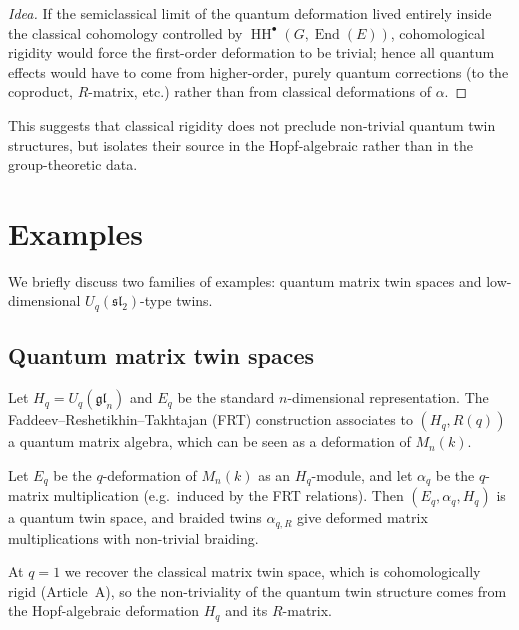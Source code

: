 \documentclass[11pt,a4paper]{article}
\numberwithin{equation}{section}
\DeclareMathOperator{\End}{End}
\DeclareMathOperator{\HH}{HH}
\begin{document}
	\begin{proof}[Idea]
		If the semiclassical limit of the quantum deformation lived entirely inside the classical cohomology 
		controlled by $\HH^\bullet(G,\End(E))$, cohomological rigidity would force the first-order deformation 
		to be trivial; hence all quantum effects would have to come from higher-order, purely quantum corrections 
		(to the coproduct, $R$-matrix, etc.) rather than from classical deformations of $\alpha$.
	\end{proof}
	
	This suggests that classical rigidity does not preclude non-trivial quantum twin structures, but isolates 
	their source in the Hopf-algebraic rather than in the group-theoretic data.
	
	\section{Examples}
	\label{sec:examples}
	
	We briefly discuss two families of examples: quantum matrix twin spaces and low-dimensional $U_q(\mathfrak{sl}_2)$-type twins.
	
	\subsection{Quantum matrix twin spaces}
	
	Let $H_q=U_q(\mathfrak{gl}_n)$ and $E_q$ be the standard $n$-dimensional representation.
	The Faddeev--Reshetikhin--Takhtajan (FRT) construction \cite{ChariPressley1994,Kassel1995} 
	associates to $(H_q,R(q))$ a quantum matrix algebra, which can be seen as a deformation of $M_n(k)$.
	
	\begin{example}
		Let $E_q$ be the $q$-deformation of $M_n(k)$ as an $H_q$-module, and let $\alpha_q$ be the $q$-matrix
		multiplication (e.g.\ induced by the FRT relations).
		Then $(E_q,\alpha_q,H_q)$ is a quantum twin space, and braided twins $\alpha_{q,R}$ give deformed matrix
		multiplications with non-trivial braiding.
	\end{example}
	
	\begin{remark}
		At $q=1$ we recover the classical matrix twin space, which is cohomologically rigid (Article~A), so the
		non-triviality of the quantum twin structure comes from the Hopf-algebraic deformation $H_q$ and its $R$-matrix.
	\end{remark}
	
\end{document}
